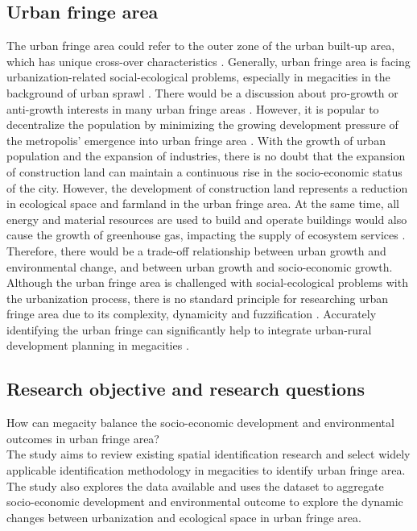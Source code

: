 \subsection{Urban fringe area}
The urban fringe area could refer to the outer zone of the urban built-up area, which has unique cross-over characteristics \parencite{cui_construction_2020}. Generally, urban fringe area is facing urbanization-related social-ecological problems, especially in megacities in the background of urban sprawl \parencite{peng_integrating_2020}. There would be a discussion about pro-growth or anti-growth interests in many urban fringe areas \parencite{pacione_development_1991}. However, it is popular to decentralize the population by minimizing the growing development pressure of the metropolis' emergence into urban fringe area \parencite{howlader_exploring_2020}. With the growth of urban population and the expansion of industries, there is no doubt that the expansion of construction land can maintain a continuous rise in the socio-economic status of the city. However, the development of construction land represents a reduction in ecological space and farmland in the urban fringe area. At the same time, all energy and material resources are used to build and operate buildings would also cause the growth of greenhouse gas, impacting the supply of ecosystem services \parencite{pedersen_zari_ecosystem_2012}. Therefore, there would be a trade-off relationship between urban growth and environmental change, and between urban growth and socio-economic growth. \\

Although the urban fringe area is challenged with social-ecological problems with the urbanization process, there is no standard principle for researching urban fringe area due to its complexity, dynamicity and fuzzification \parencite{dong_method_2022}. Accurately identifying the urban fringe can significantly help to integrate urban-rural development planning in megacities \parencite{peng_integrating_2020}.\\


\subsection{Research objective and research questions}
How can megacity balance the socio-economic development and environmental outcomes in urban fringe area?\\

The study aims to review existing spatial identification research and select widely applicable identification methodology in megacities to identify urban fringe area. The study also explores the data available and uses the dataset to aggregate socio-economic development and environmental outcome to explore the dynamic changes between urbanization and ecological space in urban fringe area.\\

